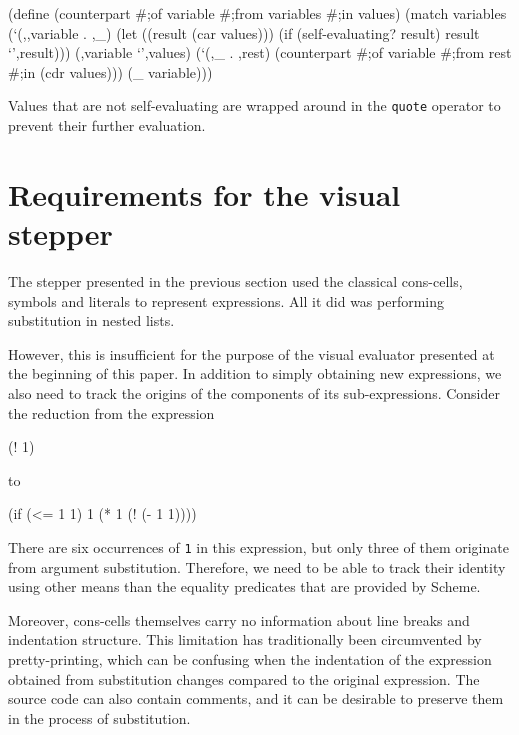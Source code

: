 \documentclass[acmsmall]{acmart}
\newenvironment{Snippet}{\Verbatim[samepage=true]}{\endVerbatim}
\begin{document}
\begin{Snippet}
(define (counterpart #;of variable #;from variables #;in values)
  (match variables
    (`(,,variable . ,_)
     (let ((result (car values)))
       (if (self-evaluating? result)
	   result
	   `',result)))
\end{Snippet}
\begin{Snippet}
    (,variable
     `',values)
\end{Snippet}
\begin{Snippet}
    (`(,_ . ,rest)
     (counterpart #;of variable #;from rest #;in (cdr values)))
\end{Snippet}
\begin{Snippet}
    (_
     variable)))
\end{Snippet}

Values that are not self-evaluating are wrapped around in the
\texttt{quote} operator to prevent their further evaluation.

\section{Requirements for the visual stepper}

The stepper presented in the previous section used the classical
cons-cells, symbols and literals to represent expressions. All it did
was performing substitution in nested lists.

However, this is insufficient for the purpose of the visual evaluator
presented at the beginning of this paper. In addition to simply obtaining
new expressions, we also need to track the origins of the components
of its sub-expressions. Consider the reduction from the expression

\begin{Snippet}
(! 1)
\end{Snippet}

to

\begin{Snippet}
(if (<= 1 1)
    1
   (* 1 (! (- 1 1))))
\end{Snippet}

There are six occurrences of \texttt{1} in this expression, but only
three of them originate from argument substitution. Therefore, we need
to be able to track their identity using other means than the equality
predicates that are provided by Scheme.

Moreover, cons-cells themselves carry no information about line breaks
and indentation structure. This limitation has traditionally been
circumvented by pretty-printing, which can be confusing when the
indentation of the expression obtained from substitution changes
compared to the original expression. The source code can also contain
comments, and it can be desirable to preserve them in the process of
substitution.
\end{document}

